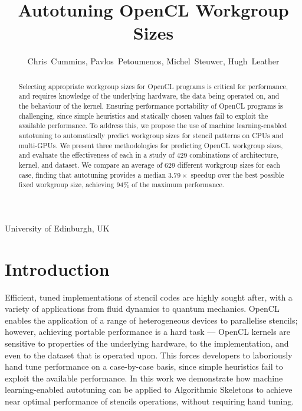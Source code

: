 \documentclass{acaces}
\begin{document}
\title{Autotuning OpenCL Workgroup Sizes}

\author{
Chris~Cummins,
Pavlos~Petoumenos,
Michel~Steuwer,
Hugh~Leather
}

\address{1}{
University of Edinburgh,
UK
}

%

\pagestyle{empty}


\begin{abstract}
  Selecting appropriate workgroup sizes for OpenCL programs is
  critical for performance, and requires knowledge of the underlying
  hardware, the data being operated on, and the behaviour of the
  kernel. Ensuring performance portability of OpenCL programs is
  challenging, since simple heuristics and statically chosen values
  fail to exploit the available performance. To address this, we
  propose the use of machine learning-enabled autotuning to
  automatically predict workgroup sizes for stencil patterns on CPUs
  and multi-GPUs. We present three methodologies for predicting OpenCL
  workgroup sizes, and evaluate the effectiveness of each in a study
  of 429 combinations of architecture, kernel, and dataset. We compare
  an average of 629 different workgroup sizes for each case, finding
  that autotuning provides a median $3.79\times$ speedup over the best
  possible fixed workgroup size, achieving 94\% of the maximum
  performance.
\end{abstract}

\vspace{-.5em}

\vspace{-2em}
\section{Introduction}

Efficient, tuned implementations of stencil codes are highly sought
after, with a variety of applications from fluid dynamics to quantum
mechanics. OpenCL enables the application of a range of heterogeneous
devices to parallelise stencils; however, achieving portable
performance is a hard task --- OpenCL kernels are sensitive to
properties of the underlying hardware, to the implementation, and even
to the dataset that is operated upon. This forces developers to
laboriously hand tune performance on a case-by-case basis, since
simple heuristics fail to exploit the available performance. In this
work we demonstrate how machine learning-enabled autotuning can be
applied to Algorithmic Skeletons to achieve near optimal performance
of stencils operations, without requiring hand tuning.
\end{document}
